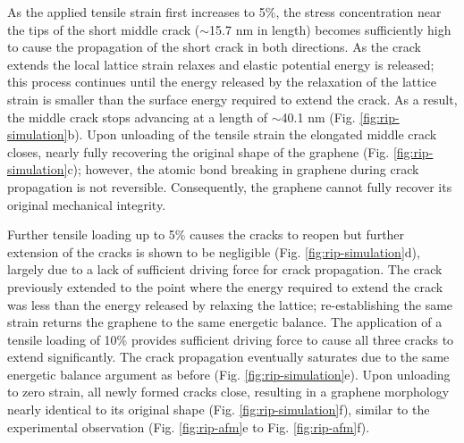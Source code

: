 \documentclass[edeposit,fullpage,draftthesis]{uiucthesis2009}
\begin{document}
        As the applied tensile strain first increases to 5\%, the stress concentration
        near the tips of the short middle crack ($\sim$15.7 nm in length) becomes
        sufficiently high to cause the propagation of the short crack in both
        directions. As the crack extends the local lattice strain relaxes and elastic
        potential energy is released; this process continues until the energy
        released by the relaxation of the lattice strain is smaller than the surface energy
        required to extend the crack. As a result, the middle crack
        stops advancing at a length of $\sim$40.1 nm (Fig. \ref{fig:rip-simulation}b). Upon unloading of the
        tensile strain the elongated middle crack closes, nearly fully recovering the
        original shape of the graphene (Fig. \ref{fig:rip-simulation}c); however, the atomic bond breaking in
        graphene during crack propagation is not reversible. Consequently, the graphene
        cannot fully recover its original mechanical integrity.
        
        Further tensile loading up to 5\% causes the cracks to reopen but further
        extension of the cracks is shown to be negligible (Fig. \ref{fig:rip-simulation}d), largely due to a
        lack of sufficient driving force for crack propagation. The crack
        previously extended to the point where the energy required to extend the crack
        was less than the energy released by relaxing the lattice; re-establishing
        the same strain returns the graphene to the same energetic balance. The application of a
        tensile loading of 10\% provides sufficient driving force to cause all three
        cracks to extend significantly. The crack propagation eventually saturates due
        to the same energetic balance argument as before (Fig. \ref{fig:rip-simulation}e). Upon
        unloading to zero strain, all newly formed cracks close, resulting in a
        graphene morphology nearly identical to its original shape (Fig. \ref{fig:rip-simulation}f), similar
        to the experimental observation (Fig. \ref{fig:rip-afm}e to Fig. \ref{fig:rip-afm}f).
        
\end{document}
